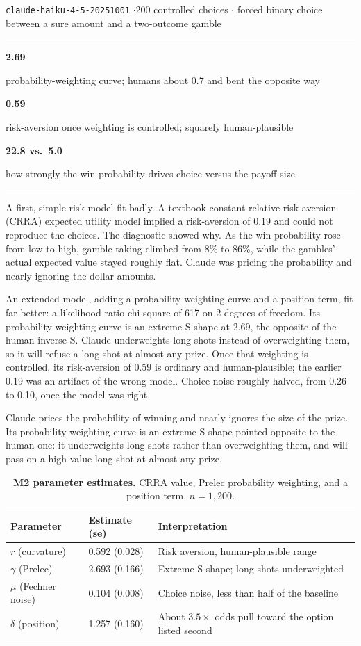 \documentclass[11pt]{article}
\newcommand{\herostat}[2]{%
  \begin{minipage}[t]{0.315\linewidth}%
    \centering
    {\fontsize{30}{32}\selectfont\bfseries\color{moss} #1}\\[5pt]
    {\footnotesize\color{mutegray}\setlength{\baselineskip}{11pt} #2\par}%
  \end{minipage}%
}
\newenvironment{herorow}
  {\par\vspace{4pt}\noindent\color{rulegray}\rule{\linewidth}{0.8pt}\par
   \vspace{9pt}\noindent}
  {\par\vspace{9pt}\noindent\color{rulegray}\rule{\linewidth}{0.8pt}\par\vspace{4pt}}
\begin{document}
{\small\color{mutegray} \texttt{claude-haiku-4-5-20251001} \;$\cdot$200 controlled choices
\;$\cdot$\; forced binary choice between a sure amount and a two-outcome gamble}

\begin{herorow}
\herostat{2.69}{probability-weighting curve; humans about 0.7 and bent the opposite way}%
\hfill
\herostat{0.59}{risk-aversion once weighting is controlled; squarely human-plausible}%
\hfill
\herostat{22.8 vs.\ 5.0}{how strongly the win-probability drives choice versus the payoff size}
\end{herorow}

A first, simple risk model fit badly. A textbook constant-relative-risk-aversion (CRRA) expected
utility model implied a risk-aversion of 0.19 and could not reproduce the choices. The diagnostic
showed why. As the win probability rose from low to high, gamble-taking climbed from 8\% to 86\%,
while the gambles' actual expected value stayed roughly flat. Claude was pricing the probability and
nearly ignoring the dollar amounts.

An extended model, adding a probability-weighting curve and a position term, fit far better: a
likelihood-ratio chi-square of 617 on 2 degrees of freedom. Its probability-weighting curve is an
extreme S-shape at 2.69, the opposite of the human inverse-S. Claude underweights long shots instead
of overweighting them, so it will refuse a long shot at almost any prize. Once that weighting is
controlled, its risk-aversion of 0.59 is ordinary and human-plausible; the earlier 0.19 was an
artifact of the wrong model. Choice noise roughly halved, from 0.26 to 0.10, once the model was right.

\begin{resultcard}
Claude prices the probability of winning and nearly ignores the size of the prize. Its
probability-weighting curve is an extreme S-shape pointed opposite to the human one: it underweights
long shots rather than overweighting them, and will pass on a high-value long shot at almost any
prize.
\end{resultcard}

\begin{table}[h]
\centering
\small
\caption*{\small\textbf{M2 parameter estimates.} CRRA value, Prelec probability weighting, and a
position term. $n = 1{,}200$.}
\begin{tabular}{@{}l l l@{}}
\toprule
\textbf{Parameter} & \textbf{Estimate (se)} & \textbf{Interpretation} \\
\midrule
$r$ (curvature)       & 0.592 (0.028) & Risk aversion, human-plausible range \\
$\gamma$ (Prelec)     & 2.693 (0.166) & Extreme S-shape; long shots underweighted \\
$\mu$ (Fechner noise) & 0.104 (0.008) & Choice noise, less than half of the baseline \\
$\delta$ (position)   & 1.257 (0.160) & About $3.5\times$ odds pull toward the option listed second \\
\bottomrule
\end{tabular}
\end{table}
\end{document}
